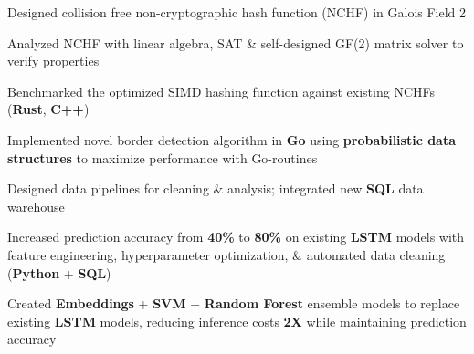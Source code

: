 \documentclass[]{chandan-cv}
\begin{document}
\begin{minipage}[t]{0.78\textwidth}
\begin{tightemize}
        \item Designed collision free non-cryptographic hash function (NCHF) in Galois Field 2
        \item Analyzed NCHF with linear algebra, SAT \& self-designed GF(2) matrix solver to verify properties
        \item Benchmarked the optimized SIMD hashing function against existing NCHFs (\textbf{Rust}, \textbf{C++})
        \item Implemented novel border detection algorithm in \textbf{Go} using \textbf{probabilistic data structures} to maximize performance with Go-routines
\end{tightemize}
\sectionsep

\begin{tightemize}
        \item Designed data pipelines for cleaning \& analysis; integrated new \textbf{SQL} data warehouse
        \item Increased prediction accuracy from \textbf{40\%} to \textbf{80\%} on existing \textbf{LSTM} 
  models with feature engineering, hyperparameter optimization, \& automated data cleaning (\textbf{Python} + \textbf{SQL})
        \item Created \textbf{Embeddings} + \textbf{SVM} + \textbf{Random Forest} ensemble models to replace existing 
  \textbf{LSTM} models, reducing inference costs \textbf{2X} while maintaining prediction accuracy
\end{tightemize}
\sectionsep
\end{minipage}

\newpage
\end{document}
